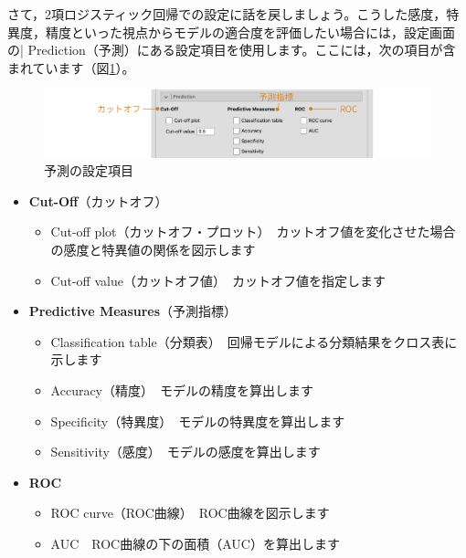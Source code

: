 \documentclass[
  12pt,
  a5jpaper,
  lualatex, ja=standard]{bxjsbook}
\providecommand{\tightlist}{%
  \setlength{\itemsep}{0pt}\setlength{\parskip}{0pt}}
\newenvironment{jmvsettings}{%
	\begin{center}%
	\begin{tcolorbox}[%
		title=設定項目,
		colframe=gmoji,
		colbacktitle=gmoji,
		colback=gmoji!2!white,
		breakable,
		width=.9\textwidth,
		]\small\addtolength{\leftmargini}{-3\labelsep}%
	}%
	{\end{tcolorbox}\end{center}}
\begin{document}
さて，2項ロジスティック回帰での設定に話を戻しましょう。こうした感度，特異度，精度といった視点からモデルの適合度を評価したい場合には，設定画面の\colorbox{bar}{\textcolor{gmoji2}{| Prediction}}（予測）にある設定項目を使用します。ここには，次の項目が含まれています（図\ref{fig:regression-binomial-prediction}）。

\begin{figure}[!ht]

{\centering \includegraphics[width=1\linewidth]{images/regression/binomial-prediction} 

}

\caption{予測の設定項目}\label{fig:regression-binomial-prediction}
\end{figure}

\begin{jmvsettings}

\begin{itemize}
\tightlist
\item
  \textbf{Cut-Off}（カットオフ）

  \begin{itemize}
  \tightlist
  \item
    Cut-off plot（カットオフ・プロット）　カットオフ値を変化させた場合の感度と特異値の関係を図示します
  \item
    Cut-off value（カットオフ値）　カットオフ値を指定します
  \end{itemize}
\item
  \textbf{Predictive Measures}（予測指標）

  \begin{itemize}
  \tightlist
  \item
    Classification table（分類表）　回帰モデルによる分類結果をクロス表に示します
  \item
    Accuracy（精度）　モデルの精度を算出します
  \item
    Specificity（特異度）　モデルの特異度を算出します
  \item
    Sensitivity（感度）　モデルの感度を算出します
  \end{itemize}
\item
  \textbf{ROC}

  \begin{itemize}
  \tightlist
  \item
    ROC curve（ROC曲線）　ROC曲線を図示します
  \item
    AUC　ROC曲線の下の面積（AUC）を算出します
  \end{itemize}
\end{itemize}

\end{jmvsettings}
\end{document}
